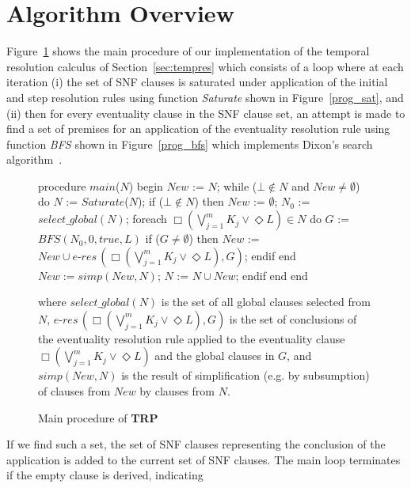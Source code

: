 \documentclass[11pt]{article}
\newcommand{\Always}[0]{\mathop{\Box}}
\newcommand{\Sometimes}[0]{\mathop{\Diamond}}
\newcommand{\TRPpp}{\textbf{TRP\protect\raisebox{0.4ex}{\scriptsize{+}{+}}}\xspace}
\begin{document}
\section{Algorithm Overview}
Figure~\ref{prog_main} shows the main procedure of our implementation
of the temporal resolution calculus of Section~\ref{sec:tempres} which
consists of a loop where at each
iteration (i) the set of SNF clauses is saturated under application of the
initial and step resolution rules using function \emph{Saturate} shown
in Figure~\ref{prog_sat}, and (ii) then for every eventuality clause
in the SNF clause set, an attempt is made to find a set of premises for an
application of the eventuality resolution rule using function
\emph{BFS} shown in Figure~\ref{prog_bfs}
which implements
Dixon's search algorithm~\cite{Dixon97:ICTL}.
\begin{figure}[htb]
\InBodyLeftNumberLine
\begin{program}\UnnumLine
procedure $\mathit{main}$($N$)\UnnumLine
begin\UnnumLine
  $New$ := $N$;\UnnumLine
  while ($\bot\not\in{N}$ and $New\neq\emptyset$) do\UnnumLine
    $N$ := $\mathit{Saturate}$($N$);\UnnumLine
    if ($\bot\not\in{N}$) then\UnnumLine
      $New$ := $\emptyset$;\UnnumLine
      $N_0$ := $\mathit{select\_global}(N)$;\UnnumLine
      foreach $\Always(\bigvee_{j=1}^m{K_j}\lor{\Sometimes{L}})\in{N}$ do\UnnumLine
        $G$ := $\mathit{BFS}(N_0,0,true,L)$\UnnumLine
        if ($G\neq\emptyset$) then\UnnumLine
          $New$ := $New\cup\mathit{e\text{-}res\,}(\Always(\bigvee_{j=1}^m{K_j}\lor{\Sometimes{L}}), G)$;\UnnumLine
        endif\UnnumLine
      end\UnnumLine
      $New := simp(New,N)$;\UnnumLine
      $N$ := $N\cup{New}$;\UnnumLine
    endif\UnnumLine
  end\UnnumLine
end
\end{program}
where
$\mathit{select\_global}(N)$ is the set of all global clauses selected from
$N$,
$\mathit{e\text{-}res\,}(\Always(\bigvee_{j=1}^m{K_j}\lor{\Sometimes{L}}), G)$
is the set of conclusions of the eventuality resolution rule 
applied to the eventuality clause
$\Always(\bigvee_{j=1}^m{K_j}\lor{\Sometimes{L}})$ and the global
clauses in $G$, and
$\mathit{simp}(\mathit{New},N)$ is the
result of simplification (e.g. by subsumption) of clauses from $\mathit{New}$
by clauses from $N$.
\caption{Main procedure of \TRPpp{}\label{prog_main}}
\end{figure}
If we find
such a set, the set of SNF clauses representing the conclusion of the
application is added to the current set of SNF clauses. 
The main loop terminates if the empty clause is derived, indicating
\end{document}
